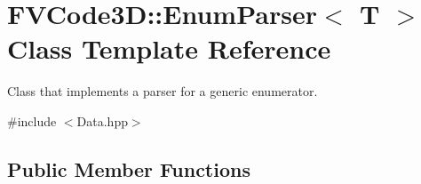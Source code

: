 \hypertarget{classFVCode3D_1_1EnumParser}{}\section{F\+V\+Code3D\+:\+:Enum\+Parser$<$ T $>$ Class Template Reference}
\label{classFVCode3D_1_1EnumParser}


Class that implements a parser for a generic enumerator.  




{\ttfamily \#include $<$Data.\+hpp$>$}

\subsection*{Public Member Functions}
